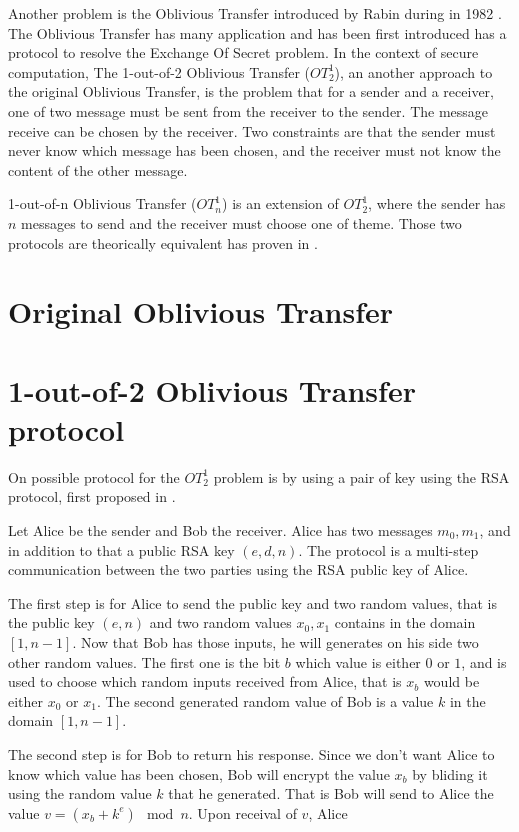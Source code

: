 \documentclass[10pt,a4paper]{article}
\begin{document}
Another problem is the Oblivious Transfer introduced by Rabin during
in 1982 \cite{rabin_how_nodate}. The Oblivious Transfer has many application
and has been first introduced has a protocol to resolve the Exchange Of
Secret problem. In the context of secure computation,
The 1-out-of-2 Oblivious Transfer ($OT^1_2$),
an another approach to the original Oblivious Transfer, is the problem
that for a sender and a receiver, one of two message must be sent
from the receiver to the sender. The message receive can be chosen
by the receiver. Two constraints are that the sender must never know
which message has been chosen, and the receiver must not know
the content of the other message.

1-out-of-n Oblivious Transfer ($OT^1_n$) is an extension of $OT^1_2$,
where the sender has $n$ messages to send and the receiver must choose
one of theme. Those two protocols are theorically equivalent
has proven in \cite{goos_equivalence_1988, goos_foundations_1998}.

\section{Original Oblivious Transfer}

\section{1-out-of-2 Oblivious Transfer protocol}

On possible protocol for the $OT^1_2$ problem is by using a pair of
key using the RSA protocol, first proposed in \cite{even_randomized_1985}.

Let Alice be the sender and Bob the receiver.
Alice has two messages $m_0,m_1$, and in addition to that
a public RSA key $(e, d, n)$. The protocol is a multi-step
communication between the two parties using the RSA public key
of Alice.

The first step is for Alice
to send the public key and two random values, that is
the public key $(e, n)$ and two random values $x_0, x_1$
contains in the domain $[1, n-1]$. Now that Bob has those inputs,
he will generates on his side two other random values.
The first one is the bit $b$ which value is either $0$ or $1$,
and is used to choose which random inputs received from Alice,
that is $x_b$ would be either $x_0$ or $x_1$. The second
generated random value of Bob is a value $k$ in the domain
$[1, n-1]$.

The second step is for Bob to return his response. Since
we don't want Alice to know which value has been chosen, Bob
will encrypt the value $x_b$ by bliding it using the random value $k$
that he generated. That is Bob will send to Alice
the value $v = (x_b + k^e) \mod n$.
Upon receival of $v$, Alice








\end{document}
